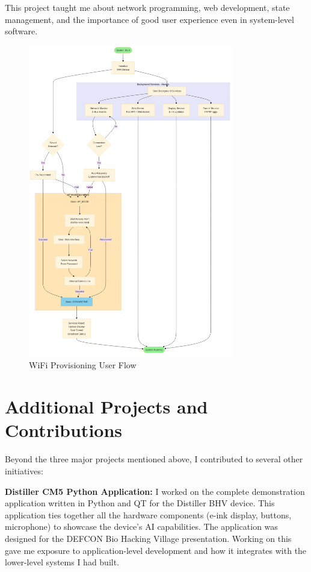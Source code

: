 \documentclass[12pt,a4paper]{report}
\begin{document}
\vspace{0.3cm}

This project taught me about network programming, web development, state management, and the importance of good user experience even in system-level software.

\begin{figure}[h]
    \centering
    \includegraphics[width=0.8\textwidth]{wifi_provisioning_flow.png}
    \caption{WiFi Provisioning User Flow}
\end{figure}

\section{Additional Projects and Contributions}

Beyond the three major projects mentioned above, I contributed to several other initiatives:

\vspace{0.3cm}

\textbf{Distiller CM5 Python Application:} I worked on the complete demonstration application written in Python and QT for the Distiller BHV device. This application ties together all the hardware components (e-ink display, buttons, microphone) to showcase the device's AI capabilities. The application was designed for the DEFCON Bio Hacking Village presentation. Working on this gave me exposure to application-level development and how it integrates with the lower-level systems I had built.
\end{document}
